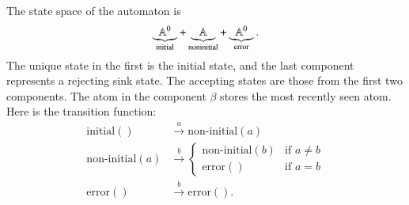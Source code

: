 {
    The state space of the automaton is 
    \begin{align*}
    \underbrace{\mathbb A^0}_{\text{initial}} + \underbrace{\mathbb A}_{\text{noninitial}} + \underbrace{\mathbb A^0}_{\text{error}}.
    \end{align*}
    The unique state in the first is the initial state, and the last component  represents a rejecting sink state. The accepting states are those from the first two  components. The atom in the component $\beta$ stores the most recently seen atom. Here is the transition function: 
    \begin{align*}
    \text{initial}()  & \stackrel a \to \text{non-initial}(a) \\
    \text{non-initial}(a) & \stackrel b \to
    \begin{cases}
        \text{non-initial}(b) & \text{if $a \neq b$} \\
        \text{error}() & \text{if $a = b$}
    \end{cases}\\
    \text{error}() & \stackrel b \to \text{error}().
    \end{align*}
}


